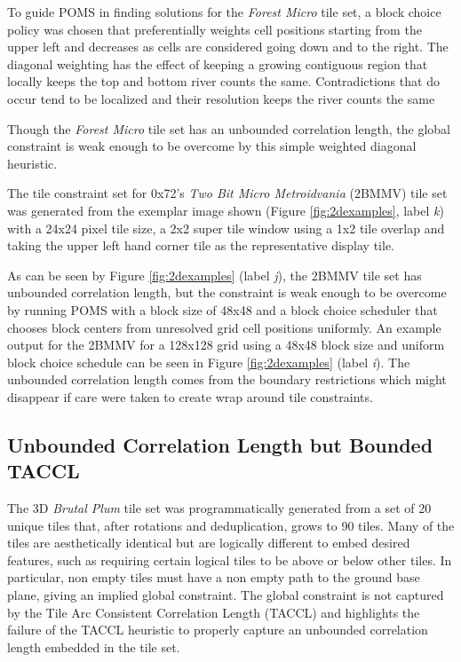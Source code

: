 To guide POMS in finding solutions for the \textit{Forest Micro} tile set, a
block choice policy was chosen that preferentially weights cell positions starting from the upper left and decreases as
cells are considered going down and to the right.
The diagonal weighting has the effect of keeping a growing contiguous region that locally keeps the top and bottom
river counts the same.
Contradictions that do occur tend to be localized and their resolution keeps the river counts the same

Though the \textit{Forest Micro} tile set has an unbounded correlation length, the global constraint is weak enough
to be overcome by this simple weighted diagonal heuristic.

The tile constraint set for 0x72's \textit{Two Bit Micro Metroidvania} (2BMMV) tile set was
generated from the exemplar image shown (Figure \ref{fig:2dexamples}, label \textit{k}) with a 24x24 pixel tile size, a 2x2 super tile window
using a 1x2 tile overlap and taking the upper left hand corner tile as the representative display tile.

As can be seen by Figure \ref{fig:2dexamples} (label \textit{j}), the 2BMMV tile set has unbounded correlation length, but the constraint is weak
enough to be overcome by running POMS with a block size of 48x48 and a block choice scheduler that chooses block centers from
unresolved grid cell positions uniformly.
An example output for the 2BMMV for a 128x128 grid using a 48x48 block size and uniform block choice schedule can be seen in Figure \ref{fig:2dexamples} (label \textit{i}).
The unbounded correlation length comes from the boundary restrictions which might disappear if care were taken
to create wrap around tile constraints.

\subsection{Unbounded Correlation Length but Bounded TACCL}

The 3D \textit{Brutal Plum} tile set was programmatically generated from a set of 20 unique tiles that, after rotations and deduplication,
grows to 90 tiles.
Many of the tiles are aesthetically identical but are logically different to embed desired features, such as requiring certain
logical tiles to be above or below other tiles.
In particular, non empty tiles must have a non empty path to the ground base plane, giving an implied global constraint.
The global constraint is not captured by the Tile Arc Consistent Correlation Length (TACCL) and highlights
the failure of the TACCL heuristic to properly capture an unbounded correlation length embedded in the tile set.

